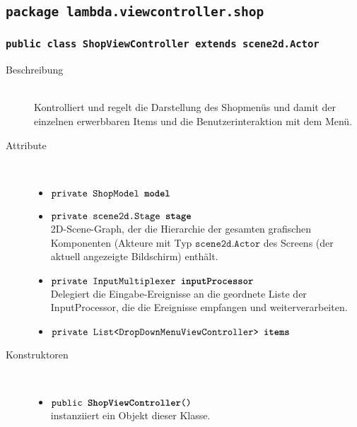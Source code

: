 \subsection{\texttt{package lambda.viewcontroller.shop}}

\subsubsection{\normalfont \texttt{public class \textbf{ShopViewController} extends scene2d.Actor}}

\begin{description}
\item[Beschreibung] \hfill \\ Kontrolliert und regelt die Darstellung des Shopmenüs und damit der einzelnen erwerbbaren Items und die Benutzerinteraktion mit dem Menü.

\item[Attribute] \hfill \\
	\vspace{-.8cm}
	\begin{itemize}	
		\item $\texttt{private ShopModel \textbf{model}}$ \\ 
		\item $\texttt{private scene2d.Stage \textbf{stage}}$ \\ 2D-Scene-Graph, der die Hierarchie der gesamten grafischen Komponenten (Akteure mit Typ $\texttt{scene2d.Actor}$ des Screens (der aktuell angezeigte Bildschirm) enthält. 
		\item $\texttt{private InputMultiplexer \textbf{inputProcessor}}$ \\ Delegiert die Eingabe-Ereignisse an die geordnete Liste der InputProcessor, die die Ereignisse empfangen und weiterverarbeiten.
		\item $\texttt{private List<DropDownMenuViewController> \textbf{items}}$ \\ 
		\end{itemize}
	
\item[Konstruktoren] \hfill \\
	\vspace{-.8cm}
	\begin{itemize}
		\item $\texttt{public \textbf{ShopViewController}()}$ \\ instanziiert ein Objekt dieser Klasse.

	\end{itemize}
	

\end{description}

